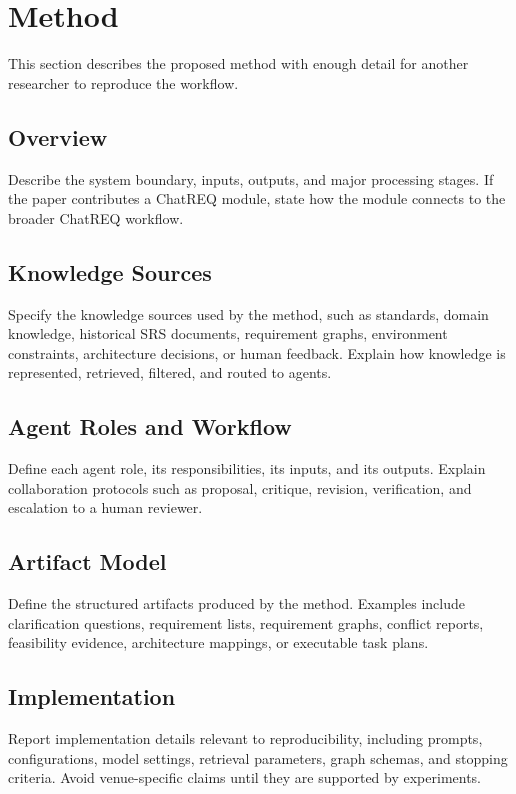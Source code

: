 \section{Method}

This section describes the proposed method with enough detail for another researcher to reproduce the workflow.

\subsection{Overview}

Describe the system boundary, inputs, outputs, and major processing stages. If the paper contributes a ChatREQ module, state how the module connects to the broader ChatREQ workflow.

\subsection{Knowledge Sources}

Specify the knowledge sources used by the method, such as standards, domain knowledge, historical SRS documents, requirement graphs, environment constraints, architecture decisions, or human feedback. Explain how knowledge is represented, retrieved, filtered, and routed to agents.

\subsection{Agent Roles and Workflow}

Define each agent role, its responsibilities, its inputs, and its outputs. Explain collaboration protocols such as proposal, critique, revision, verification, and escalation to a human reviewer.

\subsection{Artifact Model}

Define the structured artifacts produced by the method. Examples include clarification questions, requirement lists, requirement graphs, conflict reports, feasibility evidence, architecture mappings, or executable task plans.

\subsection{Implementation}

Report implementation details relevant to reproducibility, including prompts, configurations, model settings, retrieval parameters, graph schemas, and stopping criteria. Avoid venue-specific claims until they are supported by experiments.

